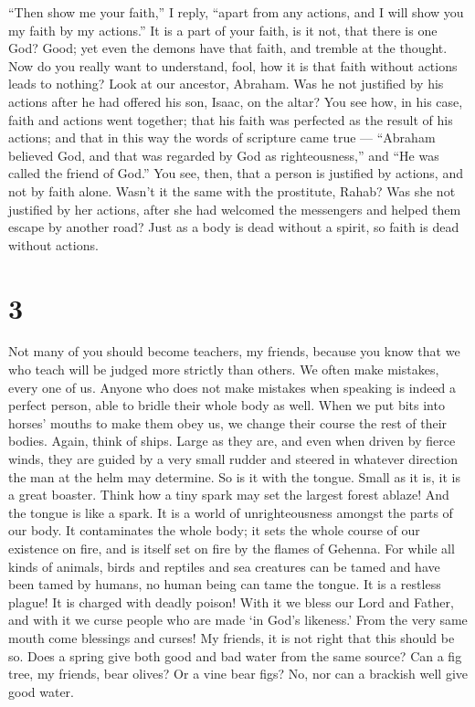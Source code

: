 ``Then show me your faith,'' I reply, ``apart from any actions, and I
will show you my faith by my actions.''  It is a part of
your faith, is it not, that there is one God? Good; yet even the demons
have that faith, and tremble at the thought.  Now do you
really want to understand, fool, how it is that faith without actions
leads to nothing?  Look at our ancestor, Abraham. Was he
not justified by his actions after he had offered his son, Isaac, on the
altar?  You see how, in his case, faith and actions went
together; that his faith was perfected as the result of his actions;
 and that in this way the words of scripture came true ---
``Abraham believed God, and that was regarded by God as righteousness,''
and ``He was called the friend of God.''  You see, then,
that a person is justified by actions, and not by faith alone.
 Wasn't it the same with the prostitute, Rahab? Was she not
justified by her actions, after she had welcomed the messengers and
helped them escape by another road?  Just as a body is dead
without a spirit, so faith is dead without actions.

\hypertarget{section-2}{%
\section{3}\label{section-2}}

 Not many of you should become teachers, my friends, because
you know that we who teach will be judged more strictly than others.
 We often make mistakes, every one of us. Anyone who does
not make mistakes when speaking is indeed a perfect person, able to
bridle their whole body as well.  When we put bits into
horses' mouths to make them obey us, we change their course the rest of
their bodies.  Again, think of ships. Large as they are, and
even when driven by fierce winds, they are guided by a very small rudder
and steered in whatever direction the man at the helm may determine.
 So is it with the tongue. Small as it is, it is a great
boaster. Think how a tiny spark may set the largest forest ablaze!
 And the tongue is like a spark. It is a world of
unrighteousness amongst the parts of our body. It contaminates the whole
body; it sets the whole course of our existence on fire, and is itself
set on fire by the flames of Gehenna.  For while all kinds
of animals, birds and reptiles and sea creatures can be tamed and have
been tamed by humans,  no human being can tame the tongue.
It is a restless plague! It is charged with deadly poison! 
With it we bless our Lord and Father, and with it we curse people who
are made `in God's likeness.'  From the very same mouth
come blessings and curses! My friends, it is not right that this should
be so.  Does a spring give both good and bad water from the
same source?  Can a fig tree, my friends, bear olives? Or a
vine bear figs? No, nor can a brackish well give good water.

